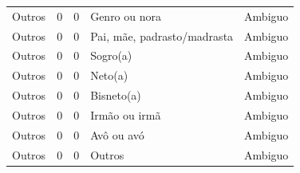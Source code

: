 \documentclass[
	12pt,				%
	openright,			%
	twoside,			%
	a4paper,			%
	english,			%
	french,				%
	spanish,			%
	brazil				%
	]{abntex2}
\begin{document}
\begin{anexosenv}
\begin{longtable}{@{}lcclc@{}}
Outros                       & 0         & 0        & Genro ou nora                & Ambiguo         \\
Outros                       & 0         & 0        & Pai, mãe, padrasto/madrasta  & Ambiguo         \\
Outros                       & 0         & 0        & Sogro(a)                     & Ambiguo         \\
Outros                       & 0         & 0        & Neto(a)                      & Ambiguo         \\
Outros                       & 0         & 0        & Bisneto(a)                   & Ambiguo         \\
Outros                       & 0         & 0        & Irmão ou irmã                & Ambiguo         \\
Outros                       & 0         & 0        & Avô ou avó                   & Ambiguo         \\
Outros                       & 0         & 0        & Outros                       & Ambiguo         \\ \bottomrule
\end{longtable}
	
	
\end{anexosenv}


\printindex
\end{document}
